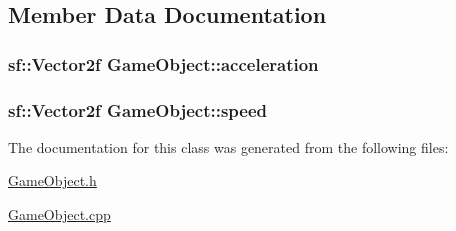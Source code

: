 \subsection{Member Data Documentation}
\hypertarget{class_game_object_a852964d6b689b4e12cc399fc67f4f8bf}{}
\subsubsection[{acceleration}]{\setlength{\rightskip}{0pt plus 5cm}sf\+::\+Vector2f Game\+Object\+::acceleration}\label{class_game_object_a852964d6b689b4e12cc399fc67f4f8bf}
\hypertarget{class_game_object_a485ee182e36f89f5493801bdd3c88d4a}{}
\subsubsection[{speed}]{\setlength{\rightskip}{0pt plus 5cm}sf\+::\+Vector2f Game\+Object\+::speed}\label{class_game_object_a485ee182e36f89f5493801bdd3c88d4a}


The documentation for this class was generated from the following files\+:\begin{DoxyCompactItemize}
\item 
\hyperlink{_game_object_8h}{Game\+Object.\+h}\item 
\hyperlink{_game_object_8cpp}{Game\+Object.\+cpp}\end{DoxyCompactItemize}
